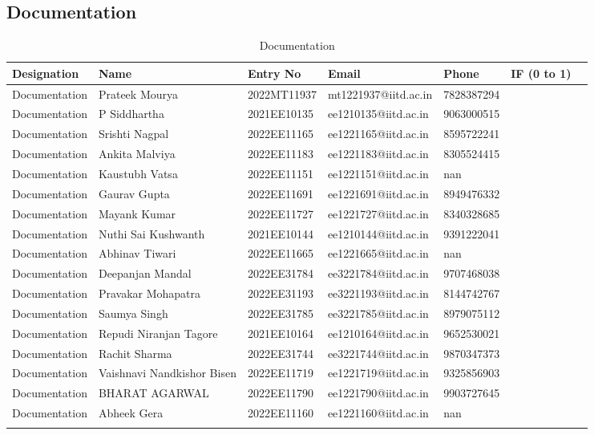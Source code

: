 \documentclass[a4paper,12pt]{article}
\begin{document}
\subsection{Documentation}
\begin{longtable}[c]{|l|l|l|l|l|l|l|}
\hline
\textbf{Designation} & \textbf{Name} & \textbf{Entry No} & \textbf{Email} & \textbf{Phone} & \textbf{IF (0 to 1)} \\
\hline
Documentation & Prateek Mourya & 2022MT11937 & mt1221937@iitd.ac.in & 7828387294 &  &  \\ \hline
Documentation & P Siddhartha & 2021EE10135 & ee1210135@iitd.ac.in & 9063000515 &  &  \\ \hline
Documentation & Srishti Nagpal & 2022EE11165 & ee1221165@iitd.ac.in & 8595722241 &  &  \\ \hline
Documentation & Ankita Malviya & 2022EE11183 & ee1221183@iitd.ac.in & 8305524415 &  &  \\ \hline
Documentation & Kaustubh Vatsa & 2022EE11151 & ee1221151@iitd.ac.in & nan &  &  \\ \hline
Documentation & Gaurav Gupta & 2022EE11691 & ee1221691@iitd.ac.in & 8949476332 &  &  \\ \hline
Documentation & Mayank Kumar & 2022EE11727 & ee1221727@iitd.ac.in & 8340328685 &  &  \\ \hline
Documentation & Nuthi Sai Kushwanth & 2021EE10144 & ee1210144@iitd.ac.in & 9391222041 &  &  \\ \hline
Documentation & Abhinav Tiwari & 2022EE11665 & ee1221665@iitd.ac.in & nan &  &  \\ \hline
Documentation & Deepanjan Mandal & 2022EE31784 & ee3221784@iitd.ac.in & 9707468038 &  &  \\ \hline
Documentation & Pravakar Mohapatra & 2022EE31193 & ee3221193@iitd.ac.in & 8144742767 &  &  \\ \hline
Documentation & Saumya Singh & 2022EE31785 & ee3221785@iitd.ac.in & 8979075112 &  &  \\ \hline
Documentation & Repudi Niranjan Tagore & 2021EE10164 & ee1210164@iitd.ac.in & 9652530021 &  &  \\ \hline
Documentation & Rachit Sharma & 2022EE31744 & ee3221744@iitd.ac.in & 9870347373 &  &  \\ \hline
Documentation & Vaishnavi Nandkishor Bisen & 2022EE11719 & ee1221719@iitd.ac.in & 9325856903 &  &  \\ \hline
Documentation & BHARAT AGARWAL & 2022EE11790 & ee1221790@iitd.ac.in & 9903727645 &  &  \\ \hline
Documentation & Abheek Gera & 2022EE11160 & ee1221160@iitd.ac.in & nan &  &  \\ \hline
\caption{Documentation}

\end{longtable}
\end{document}

